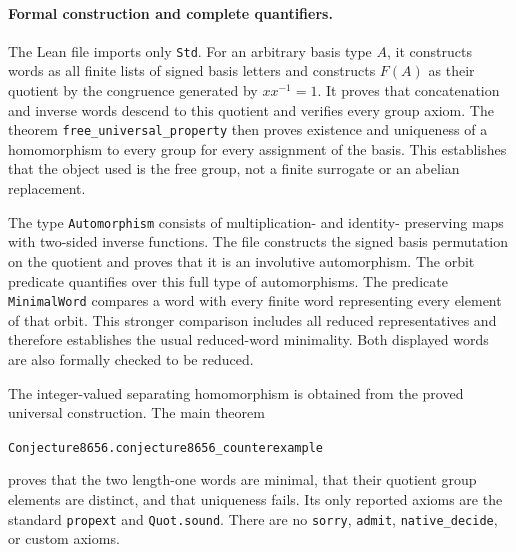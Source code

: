 \documentclass[11pt]{article}
\begin{document}
\newpage
\paragraph{Formal construction and complete quantifiers.}
The Lean file imports only \texttt{Std}.  For an arbitrary basis type $A$, it
constructs words as all finite lists of signed basis letters and constructs
$F(A)$ as their quotient by the congruence generated by
$xx^{-1}=1$.  It proves that concatenation and inverse words descend to this
quotient and verifies every group axiom.  The theorem
\texttt{free\_universal\_property} then proves existence and uniqueness of a
homomorphism to every group for every assignment of the basis.  This
establishes that the object used is the free group, not a finite surrogate or
an abelian replacement.

The type \texttt{Automorphism} consists of multiplication- and identity-
preserving maps with two-sided inverse functions.  The file constructs the
signed basis permutation on the quotient and proves that it is an
involutive automorphism.  The orbit predicate quantifies over this full type
of automorphisms.  The predicate \texttt{MinimalWord} compares a word with
every finite word representing every element of that orbit.  This stronger
comparison includes all reduced representatives and therefore establishes
the usual reduced-word minimality.  Both displayed words are also formally
checked to be reduced.

The integer-valued separating homomorphism is obtained from the proved
universal construction.  The main theorem
\begin{center}
\texttt{Conjecture8656.conjecture8656\_counterexample}
\end{center}
proves that the two length-one words are minimal, that their quotient group
elements are distinct, and that uniqueness fails.  Its only reported axioms
are the standard \texttt{propext} and \texttt{Quot.sound}.  There are no
\texttt{sorry}, \texttt{admit}, \texttt{native\_decide}, or custom axioms.
\end{document}
